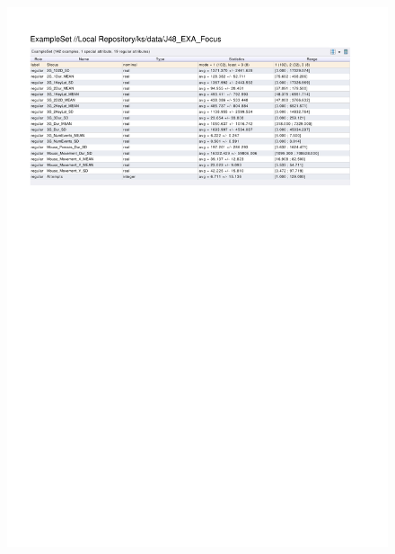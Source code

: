 \begin{figure}[htp]
  \centerline{\includegraphics[trim=0 560 0 60,clip,width=16.09cm]{results/J48_EXA_Focus.pdf}} \caption{
} \label{J48_K_Focus}
\end{figure}

